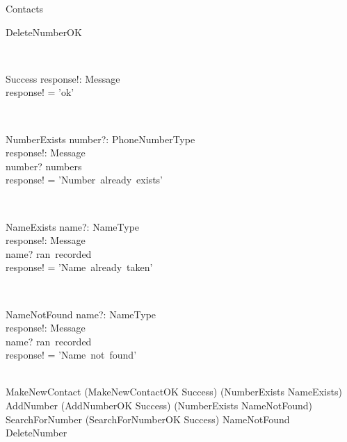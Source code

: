 \begin{class}{Contacts}
\begin{op}{DeleteNumberOK}
\ST
\end{op}\\
\begin{op}{Success}
response!: Message \\
\ST
response! = 'ok'
\end{op}\\
\begin{op}{NumberExists}
number?: PhoneNumberType \\
response!: Message \\
\ST
number? \in numbers \\
response! = 'Number~already~exists'
\end{op}\\
\zbreak
\begin{op}{NameExists}
name?: NameType \\
response!: Message \\
\ST
name? \in ran~recorded \\
response! = 'Name~already~taken'
\end{op}\\
\also
\begin{op}{NameNotFound}
    name?: NameType \\
    response!: Message \\
    \ST
    name? \notin ran~recorded \\
    response! = 'Name~not~found'
\end{op}\\
\also
MakeNewContact \sdef (MakeNewContactOK \wedge Success) \oplus (NumberExists \lor NameExists) \\
AddNumber \sdef (AddNumberOK \wedge Success) \oplus (NumberExists \lor NameNotFound) \\
SearchForNumber \sdef (SearchForNumberOK \wedge Success) \oplus NameNotFound \\
DeleteNumber \sdef
\end{class}
